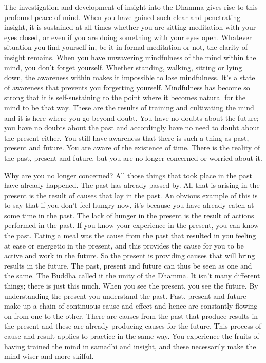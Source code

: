 The investigation and development of insight into the Dhamma gives rise to this profound peace of mind. When you have gained such clear and penetrating insight, it is sustained at all times whether you are sitting meditation with your eyes closed, or even if you are doing something with your eyes open. Whatever situation you find yourself in, be it in formal meditation or not, the clarity of insight remains. When you have unwavering mindfulness of the mind within the mind, you don't forget yourself. Whether standing, walking, sitting or lying down, the awareness within makes it impossible to lose mindfulness. It's a state of awareness that prevents you forgetting yourself. Mindfulness has become so strong that it is self-sustaining to the point where it becomes natural for the mind to be that way. These are the results of training and cultivating the mind and it is here where you go beyond doubt. You have no doubts about the future; you have no doubts about the past and accordingly have no need to doubt about the present either. You still have awareness that there is such a thing as past, present and future. You are aware of the existence of time. There is the reality of the past, present and future, but you are no longer concerned or worried about it. 

Why are you no longer concerned? All those things that took place in the past have already happened. The past has already passed by. All that is arising in the present is the result of causes that lay in the past. An obvious example of this is to say that if you don't feel hungry now, it's because you have already eaten at some time in the past. The lack of hunger in the present is the result of actions performed in the past. If you know your experience in the present, you can know the past. Eating a meal was the cause from the past that resulted in you feeling at ease or energetic in the present, and this provides the cause for you to be active and work in the future. So the present is providing causes that will bring results in the future. The past, present and future can thus be seen as one and the same. The Buddha called it  the unity of the Dhamma. It isn't many different things; there is just this much. When you see the present, you see the future. By understanding the present you understand the past. Past, present and future make up a chain of continuous cause and effect and hence are constantly flowing on from one to the other. There are causes from the past that produce results in the present and these are already producing causes for the future. This process of cause and result applies to practice in the same way. You experience the fruits of having trained the mind in sam\=adhi and insight, and these necessarily make the mind wiser and more skilful.


